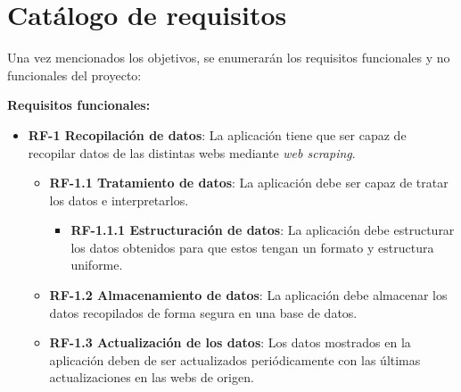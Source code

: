 \section{Catálogo de requisitos}

Una vez mencionados los objetivos, se enumerarán los requisitos funcionales y no funcionales del proyecto:

\textbf{Requisitos funcionales:}

\begin{itemize}
\item\textbf{RF-1 Recopilación de datos}: La aplicación tiene que ser capaz de recopilar datos de las distintas webs mediante \textit{web scraping}.
\begin{itemize}
\item\textbf{RF-1.1 Tratamiento de datos}: La aplicación debe ser capaz de tratar los datos e interpretarlos.
\begin{itemize}
\item\textbf{RF-1.1.1 Estructuración de datos}: La aplicación debe estructurar los datos obtenidos para que estos tengan un formato y estructura uniforme.
\end{itemize}
\item\textbf{RF-1.2 Almacenamiento de datos}: La aplicación debe almacenar los datos recopilados de forma segura en una base de datos.
\item\textbf{RF-1.3 Actualización de los datos}: Los datos mostrados en la aplicación deben de ser actualizados periódicamente con las últimas actualizaciones en las webs de origen.
\end{itemize}
\end{itemize}

